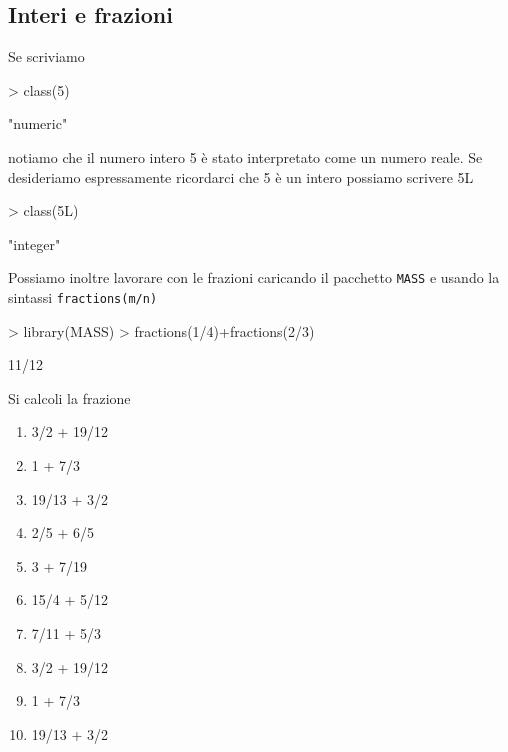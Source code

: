 \documentclass[onecolumn,11pt]{book}
\begin{document}
\subsection{Interi e frazioni}
Se scriviamo
\begin{Schunk}
\begin{Sinput}
> class(5)
\end{Sinput}
\begin{Soutput}
[1] "numeric"
\end{Soutput}
\end{Schunk}
notiamo che il numero intero 5 \`e stato interpretato come un numero reale.
Se desideriamo espressamente ricordarci che  5 \`e  un  intero possiamo scrivere 5L
\begin{Schunk}
\begin{Sinput}
> class(5L)
\end{Sinput}
\begin{Soutput}
[1] "integer"
\end{Soutput}
\end{Schunk}
Possiamo inoltre lavorare con le frazioni caricando il pacchetto \texttt{MASS} e usando la sintassi
\texttt{fractions(m/n)}
\begin{Schunk}
\begin{Sinput}
> library(MASS)
> fractions(1/4)+fractions(2/3)
\end{Sinput}
\begin{Soutput}
[1] 11/12
\end{Soutput}
\end{Schunk}

Si calcoli la frazione
\begin{enumerate}

\item  3/2 + 19/12
\item  1 + 7/3
\item  19/13 + 3/2
\item  2/5 + 6/5
\item  3 + 7/19
\item  15/4 + 5/12
\item  7/11 + 5/3
\item  3/2 + 19/12
\item  1 + 7/3
\item  19/13 + 3/2
\end{enumerate}
\end{document}
